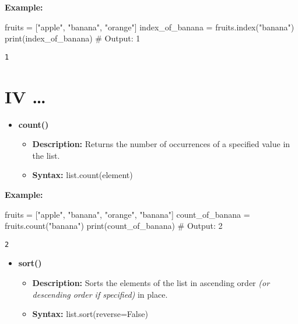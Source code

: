 \documentclass[
  letterpaper,
  DIV=11,
  numbers=noendperiod]{scrreprt}
\newenvironment{Shaded}{\begin{snugshade}}{\end{snugshade}}
\newcommand{\BuiltInTok}[1]{\textcolor[rgb]{0.00,0.23,0.31}{#1}}
\newcommand{\CommentTok}[1]{\textcolor[rgb]{0.37,0.37,0.37}{#1}}
\newcommand{\NormalTok}[1]{\textcolor[rgb]{0.00,0.23,0.31}{#1}}
\newcommand{\OperatorTok}[1]{\textcolor[rgb]{0.37,0.37,0.37}{#1}}
\newcommand{\StringTok}[1]{\textcolor[rgb]{0.13,0.47,0.30}{#1}}
\providecommand{\tightlist}{%
  \setlength{\itemsep}{0pt}\setlength{\parskip}{0pt}}
\begin{document}
\textbf{Example:}

\begin{Shaded}
\begin{Highlighting}[]
\NormalTok{fruits }\OperatorTok{=}\NormalTok{ [}\StringTok{"apple"}\NormalTok{, }\StringTok{"banana"}\NormalTok{, }\StringTok{"orange"}\NormalTok{]}
\NormalTok{index\_of\_banana }\OperatorTok{=}\NormalTok{ fruits.index(}\StringTok{"banana"}\NormalTok{)}
\BuiltInTok{print}\NormalTok{(index\_of\_banana)  }\CommentTok{\# Output: 1}
\end{Highlighting}
\end{Shaded}

\begin{verbatim}
1
\end{verbatim}

\section{IV \ldots{}}

\begin{itemize}
\tightlist
\item
  \textbf{count()}

  \begin{itemize}
  \tightlist
  \item
    \textbf{Description:} Returns the number of occurrences of a
    specified value in the list.
  \item
    \textbf{Syntax:} list.count(element)
  \end{itemize}
\end{itemize}

\textbf{Example:}

\begin{Shaded}
\begin{Highlighting}[]
\NormalTok{fruits }\OperatorTok{=}\NormalTok{ [}\StringTok{"apple"}\NormalTok{, }\StringTok{"banana"}\NormalTok{, }\StringTok{"orange"}\NormalTok{, }\StringTok{"banana"}\NormalTok{]}
\NormalTok{count\_of\_banana }\OperatorTok{=}\NormalTok{ fruits.count(}\StringTok{"banana"}\NormalTok{)}
\BuiltInTok{print}\NormalTok{(count\_of\_banana)  }\CommentTok{\# Output: 2}
\end{Highlighting}
\end{Shaded}

\begin{verbatim}
2
\end{verbatim}

\begin{itemize}
\tightlist
\item
  \textbf{sort()}

  \begin{itemize}
  \tightlist
  \item
    \textbf{Description:} Sorts the elements of the list in ascending
    order \emph{(or descending order if specified)} in place.
  \item
    \textbf{Syntax:} list.sort(reverse=False)
  \end{itemize}
\end{itemize}
\end{document}
